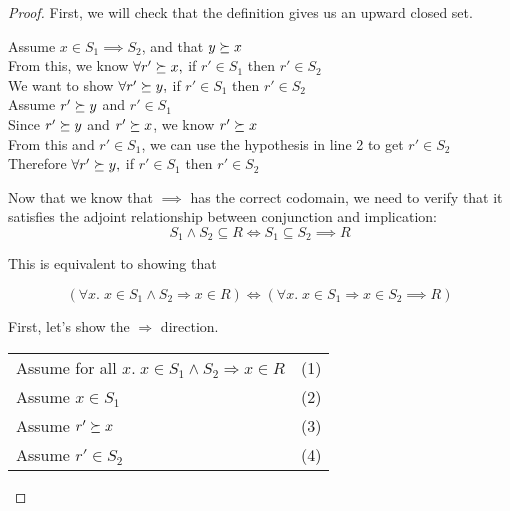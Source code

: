 \begin{proof}
First, we will check that the definition gives us an upward closed set.

\vspace{0.5em}

\begin{tabbedproof}
\oo Assume $x \in S_1 \implies S_2$, and that $y \succeq x$ \\
\ooo From this, we know $\forall r' \succeq x, $ if $r' \in S_1$ then $r' \in S_2$ \\
\ooo We want to show $\forall r' \succeq y, $ if $r' \in S_1$ then $r' \in S_2$ \\
\ooo Assume $r' \succeq y$ and $r' \in S_1$ \\
\oooo Since $r' \succeq y$ and $r' \succeq x$, we know $r' \succeq x$ \\
\oooo From this  and $r' \in S_1$, we can use the hypothesis in line 2 to get $r' \in S_2$ \\
\ooo Therefore $\forall r' \succeq y, $ if $r' \in S_1$ then $r' \in S_2$ \\
\end{tabbedproof}

\noindent Now that we know that $\implies$ has the correct codomain, we need to
verify that it satisfies the adjoint relationship between conjunction and 
implication: 
\begin{displaymath}
S_1 \land S_2 \subseteq R \iff S_1 \subseteq S_2 \implies R
\end{displaymath}

\noindent This is equivalent to showing that 

\begin{displaymath}
(\forall x.\; x \in S_1 \land S_2 \Rightarrow x \in R) \iff
(\forall x.\; x \in S_1 \Rightarrow x \in S_2 \implies R)
\end{displaymath}

\noindent First, let's show the $\Rightarrow$ direction.
\\

\begin{tabular}{ll}
Assume for all $x.\; x \in S_1 \land S_2 \Rightarrow x \in R$ &
(1)
\\

Assume $x \in S_1$ &
(2)
\\

Assume $r' \succeq x$ &
(3)
\\

Assume $r' \in S_2$ & 
(4)
\\


\end{tabular}
\end{proof}
